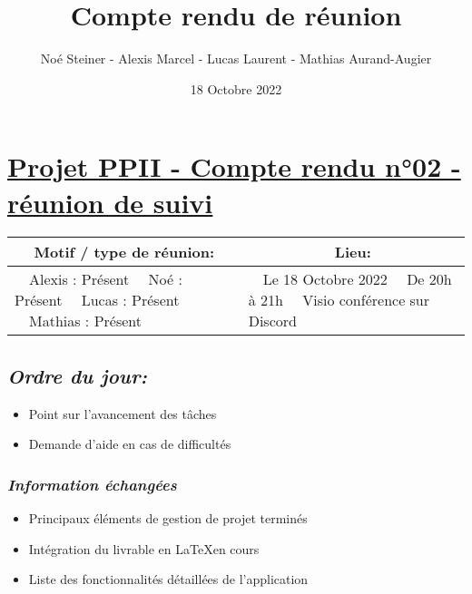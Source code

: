 \documentclass[french,a4paper]{article}
\author{Noé Steiner - Alexis Marcel - Lucas Laurent - Mathias Aurand-Augier}
\date{18 Octobre 2022}
\newcommand{\tabitem}{\textbullet~~}\title{Compte rendu de réunion}
\begin{document}
\maketitle

\section*{\underline{Projet PPII - Compte rendu n°02 - réunion de suivi}}

\begin{table}[!htb]
  \centering
  \begin{tabular}{| p{7cm} | p{7cm} |}
    \hline
    \multicolumn{1}{|c|}{ Motif / type de réunion:} & \multicolumn{1}{c|}{Lieu:} \\
    \hline
    \tabitem Alexis : Présent\newline
    \tabitem Noé : Présent\newline
    \tabitem Lucas : Présent\newline
    \tabitem Mathias : Présent                      &
    \tabitem Le 18 Octobre 2022\newline
    \tabitem De 20h à 21h\newline
    \tabitem Visio conférence sur Discord                                                                   \\
    \hline
  \end{tabular}
\end{table}

\subsection*{\textit{Ordre du jour:}}

\begin{itemize}
  \item Point sur l'avancement des tâches
  \item Demande d'aide en cas de difficultés
\end{itemize}

\subsubsection*{\textit{Information échangées}}
\begin{itemize}
  \item Principaux éléments de gestion de projet terminés
  \item Intégration du livrable en \LaTeX \space en cours
  \item Liste des fonctionnalités détaillées de l'application 
\end{itemize}
\end{document}
